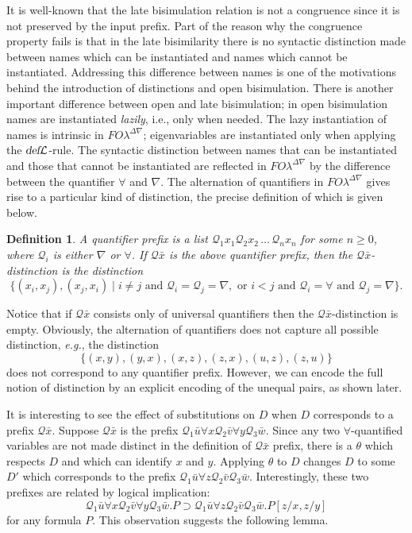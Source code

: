 \documentclass{acmtrans2m}
\newenvironment{definition}{\begin{define} \rm}{\end{define}}
\newtheorem{define}[theorem]{Definition}
\def\Qscr{{\mathcal Q}}
\newcommand{\FOL   }{FO\lambda}
\newcommand{\FOLDNb}{\FOL^{\Delta\nabla}}
\newcommand{\defL}{\hbox{\sl def}{\cal L}}
\newcommand{\oimp}{\supset}
\begin{document}
It is well-known that the late bisimulation relation is
not a congruence since it is not preserved by the input prefix.
Part of the reason why the congruence property fails 
is that in the late bisimilarity there is no syntactic distinction
made between names which can be instantiated and names which cannot be
instantiated. 
Addressing this difference between names
is one of the motivations behind the introduction 
of distinctions and open bisimulation. 
There is another important
difference between open and late bisimulation; in open bisimulation
names are instantiated {\em lazily}, i.e., only when needed. 
The lazy instantiation of
names is intrinsic in $\FOLDNb$; eigenvariables are instantiated
only when applying the $\defL$-rule. 
The syntactic distinction between names that can be instantiated and 
those that cannot be instantiated are reflected in $\FOLDNb$ by the difference between 
the quantifier $\forall$ and $\nabla$. 
The alternation of quantifiers in $\FOLDNb$ gives rise to
a particular kind of distinction, the precise definition of which
is given below.

\begin{definition}
A {\em quantifier prefix} 
is a list $\Qscr_1 x_1 \Qscr_2 x_2\, \dots \, \Qscr_n x_n$ for some $n \geq 0$,
where $\Qscr_i$ is either $\nabla$ or $\forall$.
If $\Qscr\bar{x}$ is the above quantifier prefix, then the
{\em $\Qscr\bar{x}$-distinction} is the distinction
$$
\{ (x_i, x_j), (x_j, x_i) \mid i \not = j \mbox{ and } \Qscr_i = \Qscr_j = \nabla, \mbox{ or }
    i < j \mbox{ and } \Qscr_i = \forall \mbox{ and } \Qscr_j = \nabla \}.
$$
\end{definition}
Notice that if $\Qscr\bar{x}$ consists only of universal quantifiers
then the $\Qscr\bar{x}$-distinction is empty.  Obviously, the
alternation of quantifiers does not capture all possible distinction,
{\em e.g.}, the distinction 
$$\{(x,y), (y,x), (x,z), (z,x), (u,z),(z,u) \}$$
does not correspond to any quantifier prefix.  However, we can encode
the full notion of distinction by an explicit encoding of the unequal
pairs, as shown later.

It is interesting to see the effect of  substitutions on $D$
when $D$ corresponds to a prefix $\Qscr\bar{x}$. 
Suppose $\Qscr\bar{x}$ is the prefix 
$\Qscr_1\bar{u}\forall x\Qscr_2\bar{v}\forall y\Qscr_3\bar{w}.$
Since any two $\forall$-quantified
variables are not made distinct in the definition of $\Qscr\bar{x}$ prefix,
there is a $\theta$ which respects $D$ and which can identify $x$ and $y$.
Applying $\theta$ to $D$ changes 
$D$ to some $D'$ which corresponds to the prefix 
$\Qscr_1\bar{u}\forall z\Qscr_2\bar{v}\Qscr_3\bar{w}$. 
Interestingly, these two prefixes are related by logical implication:
$$
\Qscr_1\bar{u}\forall x\Qscr_2\bar{v}\forall y\Qscr_3\bar{w}.P
\oimp
\Qscr_1\bar{u}\forall z\Qscr_2\bar{v}\Qscr_3\bar{w}.P[z/x, z/y]
$$
for any formula $P$. This observation suggests the following lemma.
\end{document}
